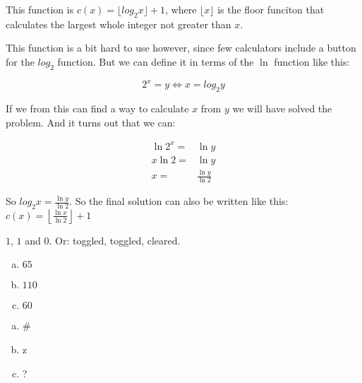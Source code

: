 \begin{Answer}[ref={count-bits-func}]
  This function is $c(x) = \lfloor log_2 x \rfloor + 1$, where $\lfloor
  x \rfloor$ is the floor funciton that calculates the largest whole
  integer not greater than $x$.

  This function is a bit hard to use however, since few calculators
  include a button for the $log_2$ function. But we can define it in
  terms of the $\ln$ function like this:

  \begin{equation*}
    2^x = y \iff x = log_2 y
  \end{equation*}

  If we from this can find a way to calculate $x$ from $y$ we will
  have solved the problem. And it turns out that we can:

  \begin{align*}
    \ln 2^x = & \ln y \\
    x \ln 2 = & \ln y \\
    x = & \frac{\ln y}{\ln 2}
  \end{align*}

  So $log_2 x = \frac{\ln y}{\ln 2}$. So the final solution can also be
  written like this: $c(x) = \left\lfloor \frac{\ln x}{\ln 2} \right\rfloor + 1$

\end{Answer}

\begin{Answer}[ref={bits-value-order}]
  $1$, $1$ and $0$. Or: toggled, toggled, cleared.

\end{Answer}

\begin{Answer}[ref={ascii-to-num}]

  \begin{enumerate}[(a)]
  \item $65$
  \item $110$
  \item $60$
  \end{enumerate}

\end{Answer}

\begin{Answer}[ref={num-to-ascii}]

  \begin{enumerate}[(a)]
  \item \#
  \item z
  \item ?
  \end{enumerate}

\end{Answer}

